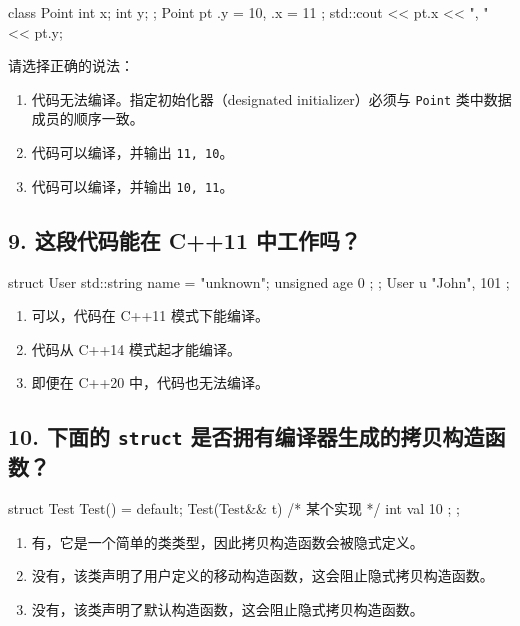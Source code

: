 \begin{codebox}[cpp]
class Point { int x; int y; };
Point pt {.y = 10, .x = 11 };
std::cout << pt.x << ", " << pt.y;
\end{codebox}

请选择正确的说法：

\begin{enumerate}
\item 代码无法编译。指定初始化器（designated initializer）必须与 \texttt{Point} 类中数据成员的顺序一致。
\item 代码可以编译，并输出 \texttt{11, 10}。
\item 代码可以编译，并输出 \texttt{10, 11}。
\end{enumerate}

\subsection{9. 这段代码能在 C++11 中工作吗？}

\begin{codebox}[cpp]
struct User { std::string name = "unknown"; unsigned age { 0 }; };
User u { "John", 101 };
\end{codebox}

\begin{enumerate}
\item 可以，代码在 C++11 模式下能编译。
\item 代码从 C++14 模式起才能编译。
\item 即便在 C++20 中，代码也无法编译。
\end{enumerate}

\subsection{10. 下面的 \texttt{struct} 是否拥有编译器生成的拷贝构造函数？}

\begin{codebox}[cpp]
struct Test {
Test() = default;
Test(Test&& t) { /* 某个实现 */ }
int val { 10 };
};
\end{codebox}

\begin{enumerate}
\item 有，它是一个简单的类类型，因此拷贝构造函数会被隐式定义。
\item 没有，该类声明了用户定义的移动构造函数，这会阻止隐式拷贝构造函数。
\item 没有，该类声明了默认构造函数，这会阻止隐式拷贝构造函数。
\end{enumerate}

